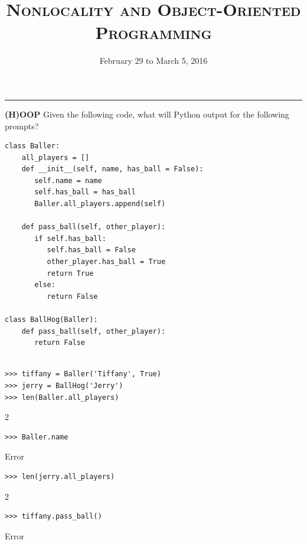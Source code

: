 \documentclass{exam}
\title{\textsc{Nonlocality and Object-Oriented Programming}}
\date{February 29 to March 5, 2016}
\begin{document}
\maketitle
\rule{\textwidth}{0.15em}
\fontsize{12}{15}\selectfont




\begin{questions}
\begin{blocksection}
\question \textbf{(H)OOP} \newline
Given the following code, what will Python output for the following prompts? 

\begin{lstlisting}
class Baller:
    all_players = []
    def __init__(self, name, has_ball = False):
       self.name = name
       self.has_ball = has_ball
       Baller.all_players.append(self)
    
    def pass_ball(self, other_player):
       if self.has_ball:
          self.has_ball = False
          other_player.has_ball = True
          return True
       else:
          return False

class BallHog(Baller):
    def pass_ball(self, other_player):  
       return False 
       
\end{lstlisting}

\begin{lstlisting}
>>> tiffany = Baller('Tiffany', True)
>>> jerry = BallHog('Jerry')
>>> len(Baller.all_players)
\end{lstlisting}
\begin{solution}[.2in]
2
\end{solution}

\begin{lstlisting}
>>> Baller.name
\end{lstlisting}
\begin{solution}[.2in]
Error
\end{solution}

\begin{lstlisting}
>>> len(jerry.all_players)
\end{lstlisting}
\begin{solution}[.2in]
2
\end{solution}
\end{blocksection}

\begin{blocksection}
\begin{lstlisting}
>>> tiffany.pass_ball()
\end{lstlisting}
\begin{solution}[.2in]
Error
\end{solution}


\end{blocksection}
\end{questions}
\end{document}
